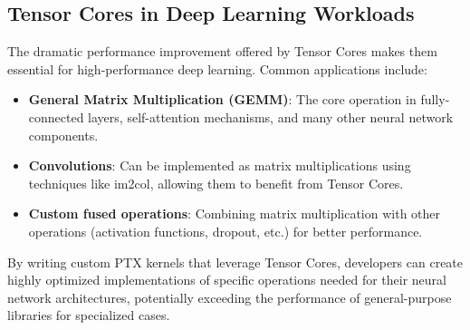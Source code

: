 \subsection{Tensor Cores in Deep Learning Workloads}

The dramatic performance improvement offered by Tensor Cores makes them essential for high-performance deep learning. Common applications include:

\begin{itemize}
    \item \textbf{General Matrix Multiplication (GEMM)}: The core operation in fully-connected layers, self-attention mechanisms, and many other neural network components.
    
    \item \textbf{Convolutions}: Can be implemented as matrix multiplications using techniques like im2col, allowing them to benefit from Tensor Cores.
    
    \item \textbf{Custom fused operations}: Combining matrix multiplication with other operations (activation functions, dropout, etc.) for better performance.
\end{itemize}

By writing custom PTX kernels that leverage Tensor Cores, developers can create highly optimized implementations of specific operations needed for their neural network architectures, potentially exceeding the performance of general-purpose libraries for specialized cases.


